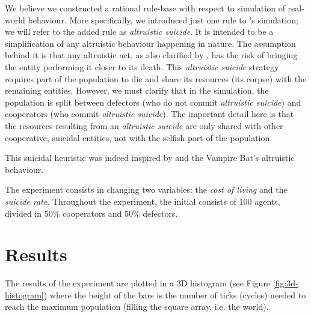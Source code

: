 \documentclass[a4paper,12pt,twocolumn]{article}
\begin{document}
\begin{flushleft}
We believe we constructed a rational rule-base with respect to simulation of real-world behaviour. More specifically, we introduced just one rule to \citeauthor{smaldino}'s simulation; we will refer to the added rule as \textit{altruistic suicide}. It is intended to be a simplification of any altruistic behaviour happening in nature. The assumption behind it is that any altruistic act, as also clarified by \citet[p. 451]{smaldino}, has the risk of bringing the entity performing it closer to its death. This \textit{altruistic suicide} strategy requires part of the population to die and share its resources (its corpse) with the remaining entities. However, we must clarify that in the simulation, the population is split between defectors (who do not commit \textit{altruistic suicide}) and cooperators (who commit \textit{altruistic suicide}). The important detail here is that the resources resulting from an \textit{altruistic suicide} are only shared with other cooperative, suicidal entities, not with the selfish part of the population.
\end{flushleft}

\begin{flushleft}
This suicidal heuristic was indeed inspired by \citet{bats} and the Vampire Bat's altruistic behaviour.
\end{flushleft}

\begin{flushleft}
The experiment consists in changing two variables: the \textit{cost of living} and the \textit{suicide rate}. Throughout the experiment, the initial consists of 100 agents, divided in 50\% cooperators and 50\% defectors.
\end{flushleft}


\section{Results}

\begin{flushleft}
 The results of the experiment are plotted in a 3D histogram (see Figure \ref{fig:3d-histogram}) where the height of the bars is the number of ticks (cycles) needed to reach the maximum population (filling the square array, i.e. the world).
\end{flushleft}
\end{document}
